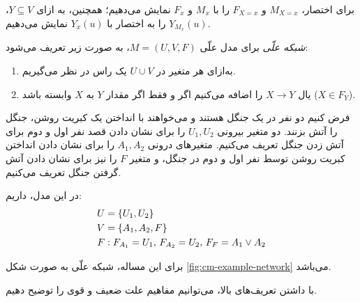 برای اختصار،
$M_{X=x}$ و $F_{X=x}$
را با
$M_x$ و $F_x$
نمایش می‌دهیم؛ همچنین،
به ازای
$Y \subseteq V$،
$Y_{M_x}(u)$
را به اختصار با
$Y_x(u)$
نمایش می‌دهیم.

\begin{definition}\label{def:causal-network}
  \textit{شبکه علّی}
  برای مدل علّی
  $M=(U,V,F)$،
  به صورت زیر تعریف می‌شود:
  \begin{enumerate}[label=(\alph*)]
    \item به‌ازای هر متغیر در
    $U \cup V$
    یک راس در نظر می‌گیریم.
    \item یال
    $X \to Y$
    را اضافه می‌کنیم اگر و فقط اگر
    مقدار
    $Y$
    به
    $X$
    وابسته باشد
    ($X \in F_Y$).
  \end{enumerate}
\end{definition}

\begin{example}\label{ex:causal-model}
  فرض کنیم دو نفر در یک جنگل هستند
  و می‌خواهند با انداختن یک کبریت روشن،
  جنگل را آتش بزنند.
  دو متغیر بیرونی
  $U_1,U_2$
  را برای نشان دادن قصد نفر اول و دوم
  برای آتش زدن جنگل تعریف می‌کنیم.
  متغیرهای درونی
  $A_1,A_2$
  را برای نشان دادن انداختن کبریت روشن
  توسط نفر اول و دوم در جنگل،
  و متغیر
  $F$
  را نیز برای نشان دادن آتش گرفتن جنگل تعریف می‌کنیم. 

  در این مدل، داریم:
  \begin{align*}
    U & = \left\{ U_1,U_2 \right\} \\
    V & = \left\{ A_1,A_2,F \right\} \\
    F & :
      F_{A_1}=U_1,\,
      F_{A_2}=U_2,\,
      F_{F}=A_1 \vee A_2
  \end{align*}

  برای این مساله، شبکه علّی به صورت شکل
  \ref{fig:cm-example-network}
  می‌باشد.

  
\end{example}

با داشتن تعریف‌های بالا،
می‌توانیم مفاهیم علت ضعیف و قوی را توضیح دهیم.

